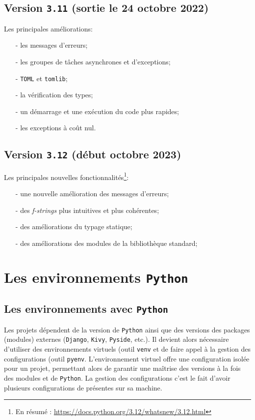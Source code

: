 \documentclass[a4paper,11pt]{book}
\begin{document}
\section{Version \texttt{3.11} (sortie le 24 octobre 2022)}
Les principales améliorations:
\begin{itemize}
	\item[-] les messages d'erreurs;
	\item[-] les groupes de tâches asynchrones et d'exceptions;
	\item[-] \texttt{TOML} et \texttt{tomlib};
	\item[-] la vérification des types;
	\item[-] un démarrage et une exécution du code plus rapides;
	\item[-] les exceptions à coût nul.
\end{itemize}
\medskip

\section{Version \texttt{3.12} (début octobre 2023)}
Les principales nouvelles fonctionnalités\footnote{En résumé : \url{https://docs.python.org/3.12/whatsnew/3.12.html}}:
\begin{itemize}
	\item[-] une nouvelle amélioration des messages d'erreurs;
	\item[-] des \textit{f-strings} plus intuitives et plus cohérentes;
	\item[-] des améliorations du typage statique;
	\item[-] des améliorations des modules de la bibliothèque standard;
\end{itemize}
\chapter{Les environnements \texttt{Python}}
\section{Les environnements avec \texttt{Python}}
Les projets dépendent de la version de \texttt{Python} ainsi que des versions des packages (modules) externes (\texttt{Django}, \texttt{Kivy}, \texttt{Pyside}, etc.). Il devient alors nécessaire d'utiliser des environnements virtuels (outil \texttt{venv} et de faire appel à la gestion des configurations (outil \texttt{pyenv}. L'environnement virtuel offre une configuration isolée pour un projet, permettant alors de garantir une maîtrise des versions à la fois des modules et de \texttt{Python}. La gestion des configurations c'est le fait d'avoir plusieurs configurations de présentes sur sa machine.
\medskip
\end{document}
